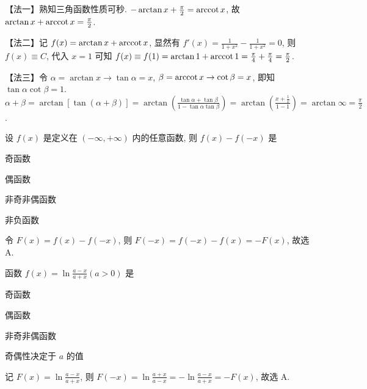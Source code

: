 \begin{analysis}
  【法一】熟知三角函数性质可秒.
  $-\arctan x + \frac{\pi}{2} = \operatorname{arccot} x$,
  故 $\arctan x + \operatorname{arccot} x = \frac{\pi}{2}$.

  【法二】记 $f(x) = \arctan x+\operatorname{arccot} x$,
  显然有 $f'(x) = \frac{1}{1+x^2} - \frac{1}{1+x^2} = 0$,
  则 $f(x) \equiv C$,
  代入 $x = 1$ 可知
  $f(x) \equiv f(1) = \arctan 1+\operatorname{arccot} 1 = \frac{\pi}{4} + \frac{\pi}{4} = \frac{\pi}{2}$.

  【法三】令 $\alpha = \arctan x  \to \tan \alpha = x$,
  $\beta = \operatorname{arccot} x  \to \cot \beta = x$,
  即知 $\tan \alpha \cot \beta = 1$.
  $\alpha + \beta = \arctan \left[ \tan \left( \alpha + \beta \right) \right]
    = \arctan \left( \frac{\tan\alpha + \tan \beta}{1 - \tan\alpha \tan\beta} \right)
    = \arctan \left( \frac{x + \frac{1}{x}}{1 - 1} \right)
    = \arctan \infty
    = \frac{\pi}{2}$.
\end{analysis}

\begin{question}
  设 $f(x) $ 是定义在 $\left( -\infty ,+\infty \right) $ 内的任意函数,
  则 $f(x) -f(-x) $ 是
  \paren[A]
  \begin{choices}
    \item 奇函数
    \item 偶函数
    \item 非奇非偶函数
    \item 非负函数
  \end{choices}
\end{question}

\begin{analysis}
  令 $F(x) = f(x) - f(-x)$,
  则 $F(-x) = f(-x) - f(x) = -F(x)$,
  故选 A.
\end{analysis}

\begin{question}
  函数 $f(x) = \ln \frac{a-x}{a+x}\left( a>0 \right) $ 是
  \paren[A]
  \begin{choices}
    \item 奇函数
    \item 偶函数
    \item 非奇非偶函数
    \item 奇偶性决定于 $a$ 的值
  \end{choices}
\end{question}

\begin{analysis}
  记 $F(x) = \ln \frac{a-x}{a+x}$,
  则
  $F(-x) = \ln \frac{a+x}{a-x} = -\ln \frac{a-x}{a+x} = -F(x)$,
  故选 A.
\end{analysis}

